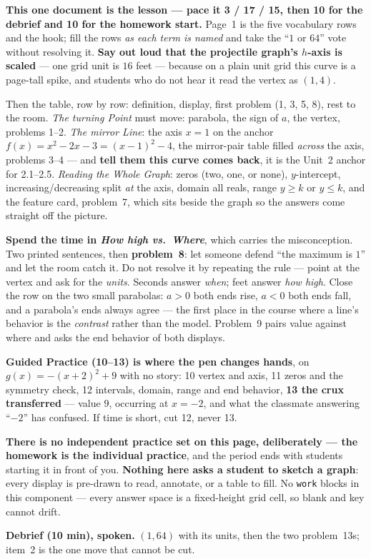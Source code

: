 \documentclass[10pt]{article}
\begin{document}
\begin{teachernote}
\textbf{This one document is the lesson --- pace it 3 / 17 / 15, then 10 for the debrief and 10
for the homework start.} Page~1 is the five vocabulary rows and the hook; fill the rows \emph{as
each term is named} and take the ``$1$ or $64$'' vote without resolving it. \textbf{Say out loud
that the projectile graph's $h$-axis is scaled} --- one grid unit is $16$ feet --- because on a
plain unit grid this curve is a page-tall spike, and students who do not hear it read the vertex
as $(1,4)$.

Then the table, row by row: definition, display, first problem (1, 3, 5, 8), rest to the room.
\emph{The turning Point} must move: parabola, the sign of $a$, the vertex, problems 1--2.
\emph{The mirror Line}: the axis $x=1$ on the anchor $f(x)=x^2-2x-3=(x-1)^2-4$, the mirror-pair
table filled \emph{across} the axis, problems 3--4 --- and \textbf{tell them this curve comes
back}, it is the Unit~2 anchor for 2.1--2.5. \emph{Reading the Whole Graph}: zeros (two, one, or
none), $y$-intercept, increasing/decreasing split \emph{at} the axis, domain all reals, range
$y\ge k$ or $y\le k$, and the feature card, problem~7, which sits beside the graph so the answers
come straight off the picture.

\textbf{Spend the time in \emph{How high vs.\ Where}}, which carries the misconception. Two
printed sentences, then \textbf{problem~8}: let someone defend ``the maximum is $1$'' and let the
room catch it. Do not resolve it by repeating the rule --- point at the vertex and ask for the
\emph{units}. Seconds answer \emph{when}; feet answer \emph{how high}. Close the row on the two
small parabolas: $a>0$ both ends rise, $a<0$ both ends fall, and a parabola's ends always agree
--- the first place in the course where a line's behavior is the \emph{contrast} rather than the
model. Problem~9 pairs value against where and asks the end behavior of both displays.

\textbf{Guided Practice (10--13) is where the pen changes hands}, on $g(x)=-(x+2)^2+9$ with no
story: 10 vertex and axis, 11 zeros and the symmetry check, 12 intervals, domain, range and end
behavior, \textbf{13 the crux transferred} --- value $9$, occurring at $x=-2$, and what the
classmate answering ``$-2$'' has confused. If time is short, cut 12, never 13.

\textbf{There is no independent practice set on this page, deliberately --- the homework is the
individual practice}, and the period ends with students starting it in front of you. \textbf{Nothing
here asks a student to sketch a graph}: every display is pre-drawn to read, annotate, or a table to
fill. No \texttt{work} blocks in this component --- every answer space is a fixed-height grid cell,
so blank and key cannot drift.

\textbf{Debrief (10 min), spoken.} $(1,64)$ with its units, then the two problem~13s; item~2 is
the one move that cannot be cut.
\end{teachernote}
\end{document}
